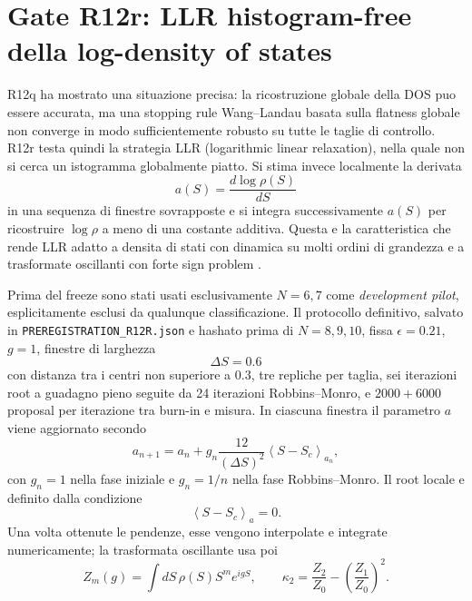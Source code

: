 \documentclass[11pt,a4paper]{article}
\begin{document}
\section{Gate R12r: LLR histogram-free della log-density of states}

R12q ha mostrato una situazione precisa: la ricostruzione globale della DOS puo essere accurata, ma una stopping rule Wang--Landau basata sulla flatness globale non converge in modo sufficientemente robusto su tutte le taglie di controllo. R12r testa quindi la strategia LLR (logarithmic linear relaxation), nella quale non si cerca un istogramma globalmente piatto. Si stima invece localmente la derivata
\begin{equation}
 a(S)=\frac{d\log\rho(S)}{dS}
\end{equation}
in una sequenza di finestre sovrapposte e si integra successivamente $a(S)$ per ricostruire $\log\rho$ a meno di una costante additiva. Questa e la caratteristica che rende LLR adatto a densita di stati con dinamica su molti ordini di grandezza e a trasformate oscillanti con forte sign problem \cite{LangfeldLuciniRago2012,LangfeldLucini2014,LangfeldEtAl2016}.

Prima del freeze sono stati usati esclusivamente $N=6,7$ come \emph{development pilot}, esplicitamente esclusi da qualunque classificazione. Il protocollo definitivo, salvato in \texttt{PREREGISTRATION\_R12R.json} e hashato prima di $N=8,9,10$, fissa $\epsilon=0.21$, $g=1$, finestre di larghezza
\begin{equation}
 \Delta S=0.6
\end{equation}
con distanza tra i centri non superiore a $0.3$, tre repliche per taglia, sei iterazioni root a guadagno pieno seguite da 24 iterazioni Robbins--Monro, e $2000+6000$ proposal per iterazione tra burn-in e misura. In ciascuna finestra il parametro $a$ viene aggiornato secondo
\begin{equation}
 a_{n+1}=a_n+g_n\frac{12}{(\Delta S)^2}\left\langle S-S_c\right\rangle_{a_n},
\end{equation}
con $g_n=1$ nella fase iniziale e $g_n=1/n$ nella fase Robbins--Monro. Il root locale e definito dalla condizione
\begin{equation}
 \left\langle S-S_c\right\rangle_a=0.
\end{equation}
Una volta ottenute le pendenze, esse vengono interpolate e integrate numericamente; la trasformata oscillante usa poi
\begin{equation}
 Z_m(g)=\int dS\,\rho(S)S^m e^{igS},\qquad
 \kappa_2=\frac{Z_2}{Z_0}-\left(\frac{Z_1}{Z_0}\right)^2.
\end{equation}
\end{document}
